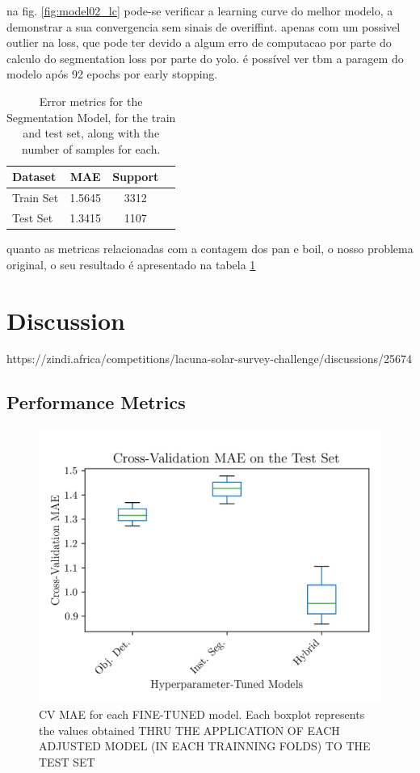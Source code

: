\documentclass[conference]{IEEEtran}
\begin{document}
na fig. \ref{fig:model02_lc} pode-se verificar a learning curve do melhor modelo, a demonstrar a sua convergencia sem sinais de overiffint. apenas com um possivel outlier na loss, que pode ter devido a algum erro de computacao por parte do calculo do segmentation loss por parte do yolo. é possível ver tbm a paragem do modelo após 92 epochs por early stopping.

\begin{table}[H]
\centering
\caption{Error metrics for the Segmentation Model, for the train and test set, along with the number of samples for each.}
\label{tab:model02_results}
\begin{tabular}{lccc}
\toprule
\textbf{Dataset} & \textbf{MAE} & \textbf{Support} \\
\midrule
Train Set & 1.5645 & 3312 \\
Test Set & 1.3415 & 1107 \\
\bottomrule
\end{tabular}
\end{table}

quanto as metricas relacionadas com a contagem dos pan e boil, o nosso problema original, o seu resultado é apresentado na tabela \ref{tab:model02_results}


\section{Discussion}

https://zindi.africa/competitions/lacuna-solar-survey-challenge/discussions/25674

\subsection{Performance Metrics}

\begin{figure}[H]
    \centering
    \includegraphics[width=1\linewidth]{assets/results_mae_boxplot.png}
    \caption{CV MAE for each FINE-TUNED model. Each boxplot represents the values obtained THRU THE APPLICATION OF EACH ADJUSTED MODEL (IN EACH TRAINNING FOLDS) TO THE TEST SET}
    \label{fig:results_mae_boxplot}
\end{figure}
\end{document}
